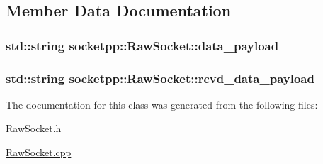 \subsection{Member Data Documentation}
\hypertarget{classsocketpp_1_1RawSocket_4d3a1236c4ac42ab029323ae14586ff8}{
\subsubsection[{data\_\-payload}]{\setlength{\rightskip}{0pt plus 5cm}std::string {\bf socketpp::RawSocket::data\_\-payload}}}
\label{classsocketpp_1_1RawSocket_4d3a1236c4ac42ab029323ae14586ff8}


\hypertarget{classsocketpp_1_1RawSocket_3e166c1c401c30b5721dc54f93772b36}{
\subsubsection[{rcvd\_\-data\_\-payload}]{\setlength{\rightskip}{0pt plus 5cm}std::string {\bf socketpp::RawSocket::rcvd\_\-data\_\-payload}}}
\label{classsocketpp_1_1RawSocket_3e166c1c401c30b5721dc54f93772b36}




The documentation for this class was generated from the following files:\begin{CompactItemize}
\item 
\hyperlink{RawSocket_8h}{RawSocket.h}\item 
\hyperlink{RawSocket_8cpp}{RawSocket.cpp}\end{CompactItemize}
